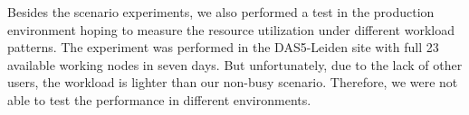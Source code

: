 Besides the scenario experiments, we also performed a test in the production environment hoping to measure the resource utilization under different workload patterns.
The experiment was performed in the DAS5-Leiden site with full 23 available working nodes in seven days. 
But unfortunately, due to the lack of other users, the workload is lighter than our non-busy scenario. 
Therefore, we were not able to test the performance in different environments.
